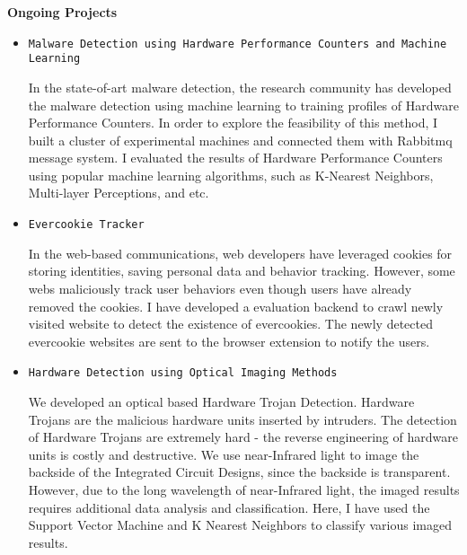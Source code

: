 \documentclass[]{article}
\begin{document}
\noindent \textbf{Ongoing Projects}
\begin{itemize}

		\item \verb+Malware Detection using Hardware Performance Counters and Machine Learning+

In the state-of-art malware detection, the research community has developed the
malware detection using machine learning to training profiles of Hardware
Performance Counters. In order to explore the feasibility of this method,  I
built a cluster of experimental machines and connected them with Rabbitmq
message system. I evaluated the results of Hardware Performance Counters using
popular machine learning algorithms, such as K-Nearest Neighbors, Multi-layer
Perceptions, and etc.

		\item \verb+Evercookie Tracker+

In the web-based communications, web developers have leveraged cookies for
storing identities, saving personal data and behavior tracking. However, some
webs maliciously track user behaviors even though users have already removed
the cookies. I have developed a evaluation backend to crawl newly visited
website to detect the existence of evercookies. The newly detected evercookie
websites are sent to the browser extension to notify the users.

		\item \verb+Hardware Detection using Optical Imaging Methods+

We developed an optical based Hardware Trojan Detection. Hardware Trojans are the malicious
hardware units inserted by intruders. The detection of Hardware Trojans are extremely hard -
the reverse engineering of hardware units is costly and destructive. We use near-Infrared light 
to image the backside of the Integrated Circuit Designs, since the backside is transparent. 
However, due to the long wavelength of near-Infrared light, the imaged results requires additional
data analysis and classification. Here, I have used the Support Vector Machine and K Nearest Neighbors to classify 
various imaged results.
		
\end{itemize}
\end{document}
